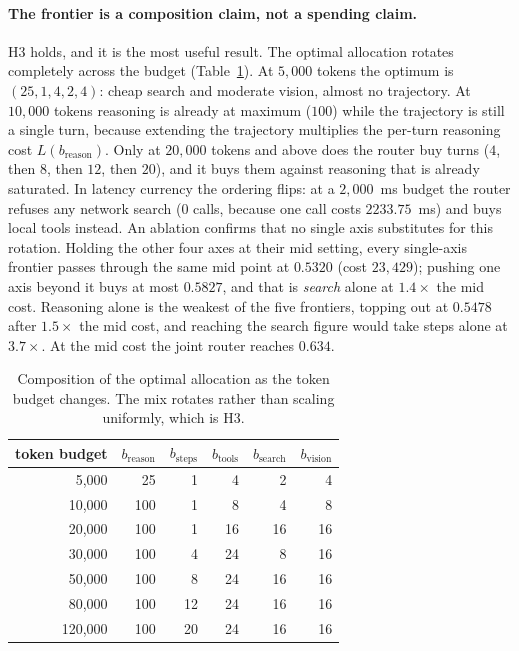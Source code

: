 \documentclass[10pt]{article} %
\newcommand{\eff}{b}
\newcommand{\reff}{\eff_{\mathrm{reason}}}
\newcommand{\stepeff}{\eff_{\mathrm{steps}}}
\newcommand{\tooleff}{\eff_{\mathrm{tools}}}
\newcommand{\searcheff}{\eff_{\mathrm{search}}}
\newcommand{\viseff}{\eff_{\mathrm{vision}}}
\begin{document}
\paragraph{The frontier is a composition claim, not a spending claim.}
H3 holds, and it is the most useful result. The optimal allocation rotates
completely across the budget (Table~\ref{tab:frontier}). At $5{,}000$ tokens the
optimum is $(25, 1, 4, 2, 4)$: cheap search and moderate vision, almost no
trajectory. At $10{,}000$ tokens reasoning is already at maximum ($100$) while
the trajectory is still a single turn, because extending the trajectory
multiplies the per-turn reasoning cost $L(\reff)$. Only at $20{,}000$ tokens and
above does the router buy turns ($4$, then $8$, then $12$, then $20$), and it
buys them against reasoning that is already saturated. In latency currency the
ordering flips: at a $2{,}000$~ms budget the router refuses any network search
($0$ calls, because one call costs $2233.75$~ms) and buys local tools instead.
An ablation confirms that no single axis substitutes for this rotation. Holding the
other four axes at their mid setting, every single-axis frontier passes through the
same mid point at $0.5320$ (cost $23{,}429$); pushing one axis beyond it buys at most
$0.5827$, and that is \emph{search} alone at $1.4\times$ the mid cost. Reasoning alone
is the weakest of the five frontiers, topping out at $0.5478$ after $1.5\times$ the mid
cost, and reaching the search figure would take steps alone at $3.7\times$. At the mid
cost the joint router reaches $0.634$.

\begin{table}[t]
\caption{Composition of the optimal allocation as the token budget changes. The
mix rotates rather than scaling uniformly, which is H3.}
\label{tab:frontier}
\begin{center}
\small
\begin{tabular}{rrrrrr}
\toprule
token budget & $\reff$ & $\stepeff$ & $\tooleff$ & $\searcheff$ & $\viseff$ \\
\midrule
5{,}000  & 25  & 1  & 4  & 2  & 4 \\
10{,}000 & 100 & 1  & 8  & 4  & 8 \\
20{,}000 & 100 & 1  & 16 & 16 & 16 \\
30{,}000 & 100 & 4  & 24 & 8  & 16 \\
50{,}000 & 100 & 8  & 24 & 16 & 16 \\
80{,}000 & 100 & 12 & 24 & 16 & 16 \\
120{,}000 & 100 & 20 & 24 & 16 & 16 \\
\bottomrule
\end{tabular}
\end{center}
\end{table}
\end{document}
